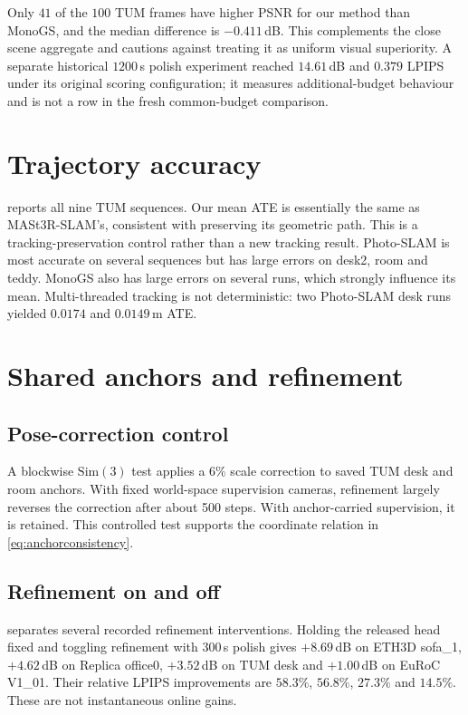 Only $41$ of the $100$ TUM frames have higher PSNR for our method than
MonoGS, and the median difference is $-0.411$\,dB. This complements the
close scene aggregate and cautions against treating it as uniform visual
superiority. A separate historical $1200$\,s polish experiment reached
$14.61$\,dB and $0.379$ LPIPS under its original scoring configuration;
it measures additional-budget behaviour and is not a row in the fresh
common-budget comparison.

\section{Trajectory accuracy}
\label{sec:exp:ate}

 reports all nine TUM sequences. Our mean ATE is essentially
the same as MASt3R-SLAM's, consistent with preserving its geometric path.
This is a tracking-preservation control rather than a new tracking result.
Photo-SLAM is most accurate on several sequences but has large errors on
desk2, room and teddy. MonoGS also has large errors on several runs, which
strongly influence its mean. Multi-threaded tracking is not deterministic:
two Photo-SLAM desk runs yielded $0.0174$ and $0.0149$\,m ATE.



\section{Shared anchors and refinement}
\label{sec:exp:refiner}

\subsection{Pose-correction control}
A blockwise $\mathrm{Sim}(3)$ test applies a 6\% scale correction to saved
TUM desk and room anchors. With fixed world-space supervision cameras,
refinement largely reverses the correction after about 500 steps. With
anchor-carried supervision, it is retained. This controlled test supports
the coordinate relation in \cref{eq:anchorconsistency}.

\subsection{Refinement on and off}
 separates several recorded refinement interventions.
Holding the released head fixed and toggling refinement with $300$\,s
polish gives $+8.69$\,dB on ETH3D sofa\_1, $+4.62$\,dB on Replica
office0, $+3.52$\,dB on TUM desk and $+1.00$\,dB on EuRoC V1\_01.
Their relative LPIPS improvements are $58.3\%$, $56.8\%$, $27.3\%$
and $14.5\%$. These are not instantaneous online gains.

